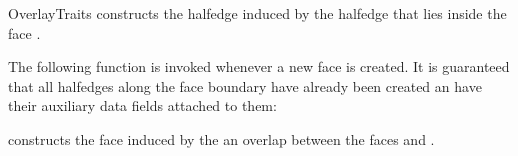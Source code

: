 \begin{ccRefConcept}{OverlayTraits}
    {constructs the halfedge  induced by the halfedge  that lies
     inside the face .}

The following function is invoked whenever a new face is created. It is
guaranteed that all halfedges along the face boundary have already been
created an have their auxiliary data fields attached to them:

    {constructs the face  induced by the an overlap between the
     faces  and .}

\ccHasModels

\\
\\

\ccSeeAlso

\end{ccRefConcept}

\ccRefPageEnd

